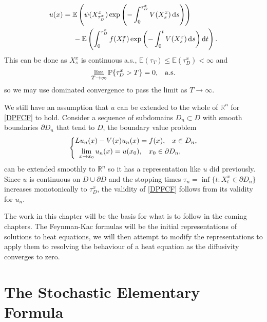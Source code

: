 \documentclass[a4paper,12pt,draft]{report}
\begin{document}
{\begin{align}
u(x) & = \mathbb{E}\left(\psi(X_{\tau_D^x}^x)\exp\left(-\int_0^{\tau_D^x}V(X_s^x)\,\mathrm{d}s\right)\right)\nonumber\\
& \hspace{0.5cm} - \mathbb{E}\left(\int_0^{\tau_D^x}f(X_t^x)\exp\left(-\int_0^tV(X_s^x)\,\mathrm{d}s\right)\mathrm{d}t\right).\nonumber
\end{align}
This can be done as $X_s^x$ is continuous a.s., $\mathbb{E}(\tau_T) \le \mathbb{E}(\tau_D^x) < \infty$ and 
$$
\lim_{T \to \infty}\mathbb{P}\{\tau_D^x > T\} = 0, \hspace{0.3cm} \mathrm{a.s.}
$$
so we may use dominated convergence to pass the limit as $T \to \infty$.

We still have an assumption that $u$ can be extended to the whole of $\mathbb{R}^n$ for \eqref{DPFCF} to hold.  Consider a sequence of subdomains $D_n \subset D$ with smooth boundaries $\partial D_n$ that tend to $D$, the boundary value problem
$$
\left\{
\begin{aligned}
 Lu_n(x) - V(x)u_n(x) & = f(x), \hspace{0.3cm} x \in D_n,\\ 
\lim_{x \to x_0}u_n(x) = u(x_0) & , \hspace{0.3cm} x_0 \in \partial D_n,
\end{aligned}
\right.
$$
can be extended smoothly to $\mathbb{R}^n$ so it has a representation like $u$ did previously.  Since $u$ is continuous on $D \cup \partial D$ and the stopping times $\tau_n = \inf\{t : X_t^x \in \partial D_n\}$ increases monotonically to $\tau_D^x$, the validity of \eqref{DPFCF} follows from its validity for $u_n$.

\qedhere
}

The work in this chapter will be the basis for what is to follow in the coming chapters.  The Feynman-Kac formulas will be the initial representations of solutions to heat equations, we will then attempt to modify the representations to apply them to resolving the behaviour of a heat equation as the diffusivity converges to zero.








\chapter{The Stochastic Elementary Formula}
\end{document}
